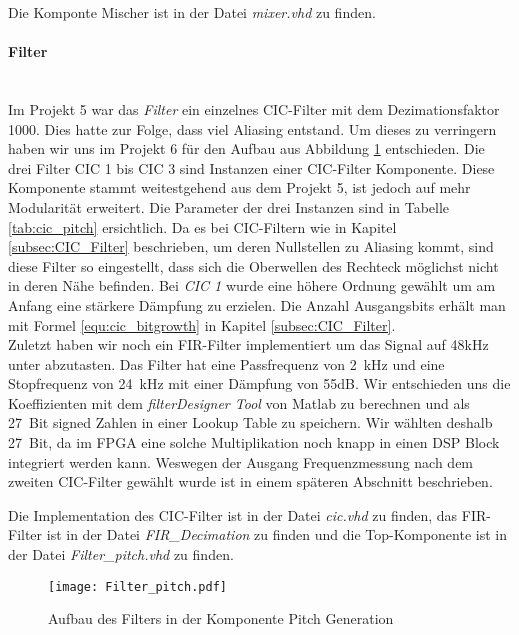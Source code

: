 Die Komponte Mischer ist in der Datei \textit{mixer.vhd} zu finden.

\paragraph{Filter}\mbox{}\\

Im Projekt 5 war das \textit{Filter} ein einzelnes CIC-Filter mit dem Dezimationsfaktor 1000. Dies hatte zur Folge, dass viel Aliasing entstand. Um dieses zu verringern haben wir uns im Projekt 6 für den Aufbau aus Abbildung \ref{img:Filter_Pitch} entschieden. Die drei Filter CIC 1 bis CIC 3 sind Instanzen einer CIC-Filter Komponente. Diese Komponente stammt weitestgehend aus dem Projekt 5, ist jedoch auf mehr Modularität erweitert. Die Parameter der drei Instanzen sind in Tabelle \ref{tab:cic_pitch} ersichtlich. Da es bei CIC-Filtern wie in Kapitel \ref{subsec:CIC_Filter} beschrieben, um deren Nullstellen zu Aliasing kommt, sind diese Filter so eingestellt, dass sich die Oberwellen des Rechteck möglichst nicht in deren Nähe befinden. Bei \textit{CIC 1} wurde eine höhere Ordnung gewählt um am Anfang eine stärkere Dämpfung zu erzielen. Die Anzahl Ausgangsbits erhält man mit Formel \ref{equ:cic_bitgrowth} in Kapitel \ref{subsec:CIC_Filter}.\\
Zuletzt haben wir noch ein FIR-Filter implementiert um das Signal auf 48kHz unter abzutasten. Das Filter hat eine Passfrequenz von \SI{2}{kHz} und eine Stopfrequenz von \SI{24}{kHz} mit einer Dämpfung von 55dB. Wir entschieden uns die Koeffizienten mit dem \textit{filterDesigner Tool} von Matlab zu berechnen und als \SI{27}{Bit} signed Zahlen in einer Lookup Table zu speichern. Wir wählten deshalb \SI{27}{Bit}, da im FPGA eine solche Multiplikation noch knapp in einen DSP Block integriert werden kann. \cite{Cyclone_V}
Weswegen der Ausgang Frequenzmessung nach dem zweiten CIC-Filter gewählt wurde ist in einem späteren Abschnitt beschrieben.

Die Implementation des CIC-Filter ist in der Datei \textit{cic.vhd} zu finden, das FIR-Filter ist in der Datei \textit{FIR\_Decimation} zu finden und die Top-Komponente ist in der Datei \textit{Filter\_pitch.vhd} zu finden.


\begin{figure}[t]
	\centering
	\texttt{[image: Filter\_pitch.pdf]}
	\caption{Aufbau des Filters in der Komponente Pitch Generation} 
	\label{img:Filter_Pitch}
\end{figure}  

